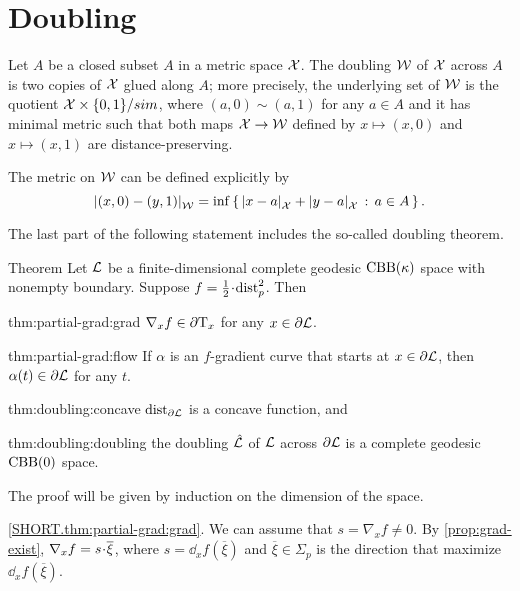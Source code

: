 \section{Doubling}

Let $A$ be a closed subset $A$ in a metric space $\mathcal{X}$.
The doubling $\mathcal{W}$ of $\mathcal{X}$ across $A$ is two copies of $\mathcal{X}$ glued along $A$;
more precisely, the underlying set of $\mathcal{W}$ is the quotient $\mathcal{X}\times\{0,1\}/sim$, where $(a,0)\sim (a,1)$ for any $a\in A$ and it has minimal metric such that both maps $\mathcal{X}\to \mathcal{W}$ defined by $x\mapsto (x,0)$ and $x\mapsto (x,1)$ are distance-preserving.

The metric on $\mathcal{W}$ can be defined explicitly by
\[\dist{(x,0)}{(y,1)}{\spc{W}}=\inf\set{\dist{x}{a}{\spc{X}}+\dist{y}{a}{\spc{X}}}{a\in A}.\]

The last part of the following statement includes the so-called doubling theorem.

\begin{thm}{Theorem}\label{thm:doubling}
Let $\mathcal{L}$ be a finite-dimensional complete geodesic $\mathrm{CBB}(\kappa)$ space with nonempty boundary.
Suppose $f\z=\tfrac12\cdot\distfun_p^2$.
Then

\begin{subthm}{thm:partial-grad:grad}
$\nabla_xf\in \partial\mathrm{T}_x$ for any $x\in\partial \mathcal{L}$.
\end{subthm}

\begin{subthm}{thm:partial-grad:flow}
If $\alpha$ is an $f$-gradient curve that starts at $x\in \partial \mathcal{L}$, then $\alpha(t)\in \partial \mathcal{L}$ for any $t$.
\end{subthm}

\begin{subthm}{thm:doubling:concave}
$\mathrm{dist}_{\partial \mathcal{L}}$ is a concave function, and
\end{subthm}

\begin{subthm}{thm:doubling:doubling}
the doubling $\hat{\mathcal{L}}$ of $\mathcal{L}$ across $\partial \mathcal{L}$ is a complete geodesic $\mathrm{CBB}(0)$ space.
\end{subthm}

\end{thm}

The proof will be given by induction on the dimension of the space.


 \ref{SHORT.thm:partial-grad:grad}.
We can assume that $s=\nabla_xf\ne 0$.
By \ref{prop:grad-exist}, $\nabla_xf\z=s\cdot \overline{\xi}$, where $s=\dd_xf(\overline{\xi})$ and $\overline{\xi}\in\Sigma_p$ is the direction that maximize $\dd_xf(\overline{\xi})$.

